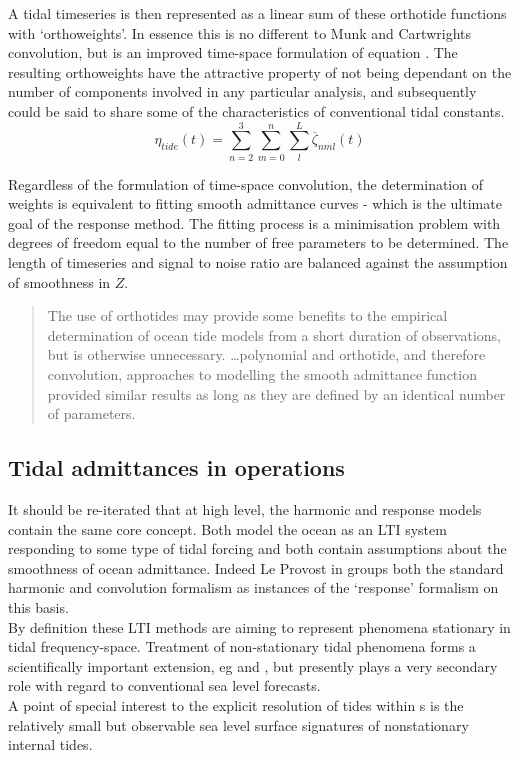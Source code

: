 A tidal timeseries is then represented as a linear sum of these orthotide functions with `orthoweights'. In essence this is no different to Munk and Cartwrights convolution, but is an improved time-space formulation of equation \label{E:Z}.  The resulting orthoweights have the attractive property of not being dependant on the number of components involved in any particular analysis, and subsequently could be said to share some of the characteristics of conventional tidal constants.
\begin{equation}
\label{E:orthosum}
\eta_{tide}(t) = \sum_{n=2}^3 \sum_{m=0}^n \sum_{l}^L \overline{\zeta}_{nml}(t)
\end{equation}

Regardless of the formulation of time-space convolution, the determination of weights is equivalent to fitting smooth admittance curves - which is the ultimate goal of the response method.  The fitting process is a minimisation problem with degrees of freedom equal to the number of free parameters to be determined.    The length of timeseries and signal to noise ratio are balanced against the assumption of smoothness in $Z$.
\begin{quotation}   
The use of orthotides may provide some benefits to the empirical determination of ocean tide models from a short duration of observations, but is otherwise unnecessary. \dots  polynomial and orthotide, and therefore convolution, approaches to modelling the smooth admittance function provided similar results as long as they are defined by an identical number of parameters.\citep{Desai:2006wo}
\end{quotation}



\subsection{Tidal admittances in operations}

It should be re-iterated that at high level, the harmonic and response models contain the same core concept.   Both model the ocean as an LTI system responding to some type of tidal forcing and both contain assumptions about the smoothness of ocean admittance.  Indeed Le Provost in \citep[chpt6]{Fu:2001ub} groups both the standard harmonic and convolution formalism as instances of the `response' formalism on this basis. \\
By definition these LTI methods are aiming to represent phenomena stationary in tidal frequency-space.  Treatment of non-stationary tidal phenomena forms a scientifically important extension, eg \citep{Colosi:2006va} and \citep{Ray:2011tj}, but presently plays a very secondary role with regard to conventional sea level forecasts.\\
A point of special interest to the explicit resolution of tides within \OGCM{}s is the relatively small but observable sea level surface signatures of nonstationary internal tides.




